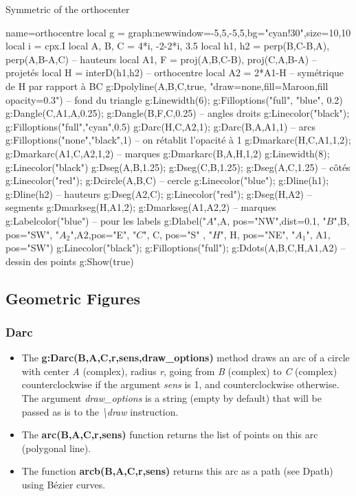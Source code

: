 \begin{demo}{Symmetric of the orthocenter}
\begin{luadraw}{name=orthocentre}
local g = graph:new{window={-5,5,-5,5},bg="cyan!30",size={10,10}}
local i = cpx.I
local A, B, C = 4*i, -2-2*i, 3.5
local h1, h2 = perp({B,C-B},A), perp({A,B-A},C) -- hauteurs
local A1, F = proj(A,{B,C-B}), proj(C,{A,B-A}) -- projetés
local H = interD(h1,h2) -- orthocentre
local A2 = 2*A1-H -- symétrique de H par rapport à BC
g:Dpolyline({A,B,C},true, "draw=none,fill=Maroon,fill opacity=0.3") -- fond du triangle
g:Linewidth(6); g:Filloptions("full", "blue", 0.2)
g:Dangle(C,A1,A,0.25); g:Dangle(B,F,C,0.25) -- angles droits
g:Linecolor("black"); g:Filloptions("full","cyan",0.5)
g:Darc(H,C,A2,1); g:Darc(B,A,A1,1) -- arcs
g:Filloptions("none","black",1) -- on rétablit l'opacité à 1
g:Dmarkarc(H,C,A1,1,2); g:Dmarkarc(A1,C,A2,1,2) -- marques
g:Dmarkarc(B,A,H,1,2)
g:Linewidth(8); g:Linecolor("black")
g:Dseg({A,B},1.25); g:Dseg({C,B},1.25); g:Dseg({A,C},1.25) -- côtés
g:Linecolor("red"); g:Dcircle(A,B,C) -- cercle
g:Linecolor("blue"); g:Dline(h1); g:Dline(h2) -- hauteurs
g:Dseg({A2,C}); g:Linecolor("red"); g:Dseg({H,A2}) -- segments
g:Dmarkseg(H,A1,2); g:Dmarkseg(A1,A2,2) -- marques
g:Labelcolor("blue") -- pour les labels
g:Dlabel("$A$",A, {pos="NW",dist=0.1}, "$B$",B, {pos="SW"}, "$A_2$",A2,{pos="E"}, "$C$", C, {pos="S" }, "$H$", H, {pos="NE"}, "$A_1$", A1, {pos="SW"})
g:Linecolor("black"); g:Filloptions("full"); g:Ddots({A,B,C,H,A1,A2}) -- dessin des points
g:Show(true)
\end{luadraw}
\end{demo}

\subsection{Geometric Figures}

\subsubsection{Darc}
\begin{itemize}
    \item The \textbf{g:Darc(B,A,C,r,sens,draw\_options)} method draws an arc of a circle with center \emph{A} (complex), radius \emph{r}, going from \emph{B} (complex) to \emph{C} (complex) counterclockwise if the argument \emph{sens} is 1, and counterclockwise otherwise. The argument \emph{draw\_options} is a string (empty by default) that will be passed as is to the \emph{\textbackslash draw} instruction.
    \item The \textbf{arc(B,A,C,r,sens)} function returns the list of points on this arc (polygonal line).
    \item The function \textbf{arcb(B,A,C,r,sens)} returns this arc as a path (see Dpath) using Bézier curves.
\end{itemize}

